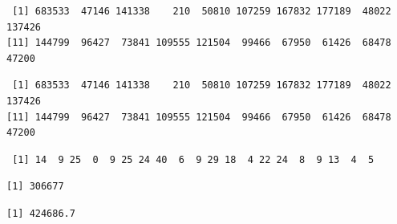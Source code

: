 \documentclass[
  letterpaper,
]{scrbook}
\newenvironment{Shaded}{\begin{snugshade}}{\end{snugshade}}
\newcommand{\CommentTok}[1]{\textcolor[rgb]{0.37,0.37,0.37}{#1}}
\newcommand{\DecValTok}[1]{\textcolor[rgb]{0.68,0.00,0.00}{#1}}
\newcommand{\FunctionTok}[1]{\textcolor[rgb]{0.28,0.35,0.67}{#1}}
\newcommand{\NormalTok}[1]{\textcolor[rgb]{0.00,0.23,0.31}{#1}}
\newcommand{\SpecialCharTok}[1]{\textcolor[rgb]{0.37,0.37,0.37}{#1}}
\begin{document}
\begin{verbatim}
 [1] 683533  47146 141338    210  50810 107259 167832 177189  48022 137426
[11] 144799  96427  73841 109555 121504  99466  67950  61426  68478  47200
\end{verbatim}

\begin{Shaded}
\end{Shaded}

\begin{verbatim}
 [1] 683533  47146 141338    210  50810 107259 167832 177189  48022 137426
[11] 144799  96427  73841 109555 121504  99466  67950  61426  68478  47200
\end{verbatim}

\begin{Shaded}
\end{Shaded}

\begin{verbatim}
 [1] 14  9 25  0  9 25 24 40  6  9 29 18  4 22 24  8  9 13  4  5
\end{verbatim}

\begin{Shaded}
\end{Shaded}

\begin{verbatim}
[1] 306677
\end{verbatim}

\begin{Shaded}
\end{Shaded}

\begin{verbatim}
[1] 424686.7
\end{verbatim}
\end{document}
